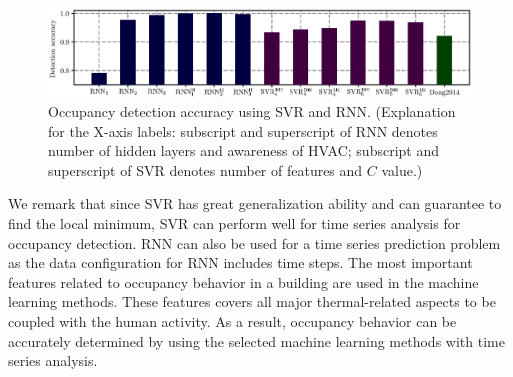\begin{figure}[h]
    \centering
    \includegraphics[width=\textwidth]{./figs/results/results_compare.eps}
    \caption{Occupancy detection accuracy using SVR and
    RNN. (Explanation for the X-axis labels: subscript and superscript of RNN
    denotes number of hidden layers and awareness of HVAC; subscript and
    superscript of SVR denotes number of features and $C$ value.)}
    \label{fig:accuracy-comparison}
\end{figure}

We remark that since SVR has great
  generalization ability and can guarantee to find the local minimum,
  SVR can perform well for time series analysis for occupancy
  detection. RNN can also be used for a time series prediction problem
  as the data configuration for RNN includes time steps. The most
  important features related to occupancy behavior in a building are
  used in the machine learning methods. These features covers all
  major thermal-related aspects to be coupled with the human
  activity. As a result, occupancy behavior can be accurately
  determined by using the selected machine learning methods with time
  series analysis.

